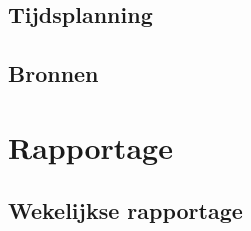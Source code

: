 \documentclass[a4paper]{article}
\begin{document}
    \newpage

  \subsection{Tijdsplanning}

  \subsection{Bronnen}

  \section{Rapportage}
    \subsection{Wekelijkse rapportage}
\end{document}
